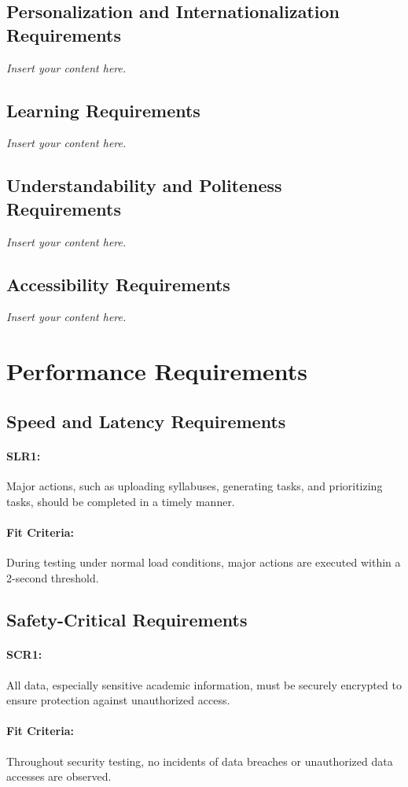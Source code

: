 \documentclass[12pt]{article}
\newcommand{\lips}{\textit{Insert your content here.}}
\begin{document}
\subsection{Personalization and Internationalization Requirements}
\lips
\subsection{Learning Requirements}
\lips
\subsection{Understandability and Politeness Requirements}
\lips
\subsection{Accessibility Requirements}
\lips

\section{Performance Requirements}

\subsection{Speed and Latency Requirements}
\paragraph{SLR1:} Major actions, such as uploading syllabuses, generating tasks, and prioritizing tasks, should be completed in a timely manner.
\paragraph{Fit Criteria:} During testing under normal load conditions, major actions are executed within a 2-second threshold.

\subsection{Safety-Critical Requirements}
\paragraph{SCR1:} All data, especially sensitive academic information, must be securely encrypted to ensure protection against unauthorized access.
\paragraph{Fit Criteria:} Throughout security testing, no incidents of data breaches or unauthorized data accesses are observed.
\end{document}

